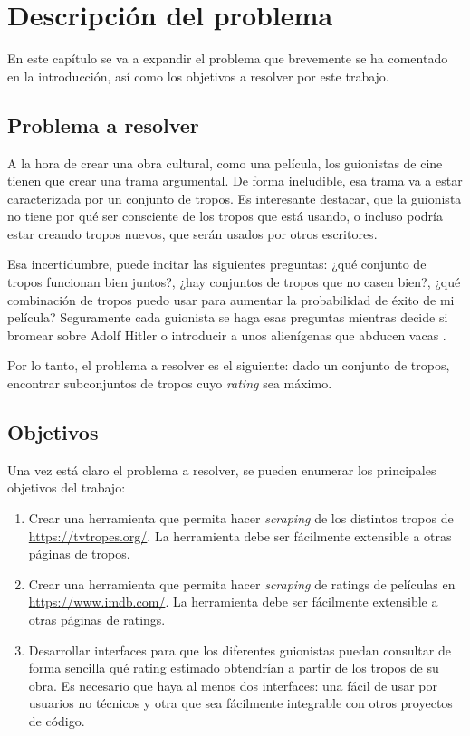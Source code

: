 \chapter{Descripción del problema}

En este capítulo se va a expandir el problema que brevemente se ha comentado en
la introducción, así como los objetivos a resolver por este trabajo.

\section{Problema a resolver}

A la hora de crear una obra cultural, como una película, los guionistas de cine
tienen que crear una trama argumental. De forma ineludible, esa trama va a
estar caracterizada por un conjunto de tropos. Es interesante destacar, que la
guionista no tiene por qué ser consciente de los tropos que está usando, o incluso podría estar creando tropos nuevos, que serán usados por otros
escritores.

Esa incertidumbre, puede incitar las siguientes preguntas: ¿qué conjunto de
tropos funcionan bien juntos?, ¿hay conjuntos de tropos que no casen bien?,
¿qué combinación de tropos puedo usar para aumentar la probabilidad de éxito de
mi película? Seguramente cada guionista se haga esas preguntas mientras decide
si bromear sobre Adolf Hitler \cite{tropo:AdolfHitlarious} o introducir a unos
alienígenas que abducen vacas \cite{tropo:AliensStealCattle}.

Por lo tanto, el problema a resolver es el siguiente: dado un conjunto de
tropos, encontrar subconjuntos de tropos cuyo \emph{rating} sea máximo.

\section{Objetivos} \label{section:goals}

Una vez está claro el problema a resolver, se pueden enumerar los principales
objetivos del trabajo:

\begin{enumerate}
      \item \label{obj:1} Crear una herramienta que permita hacer \textit{scraping} de los distintos
            tropos de \url{https://tvtropes.org/}. La herramienta debe ser fácilmente extensible a
            otras páginas de tropos.
      \item \label{obj:2} Crear una herramienta que permita hacer \textit{scraping} de ratings de
            películas en \url{https://www.imdb.com/}. La herramienta debe ser fácilmente extensible a
            otras páginas de ratings.
      \item \label{obj:3} Desarrollar interfaces para que los diferentes guionistas puedan consultar
            de forma sencilla qué rating estimado obtendrían a partir de los tropos de su obra. Es necesario
            que haya al menos dos interfaces: una fácil de usar por usuarios no técnicos y otra que sea
            fácilmente integrable con otros proyectos de código.
\end{enumerate}
